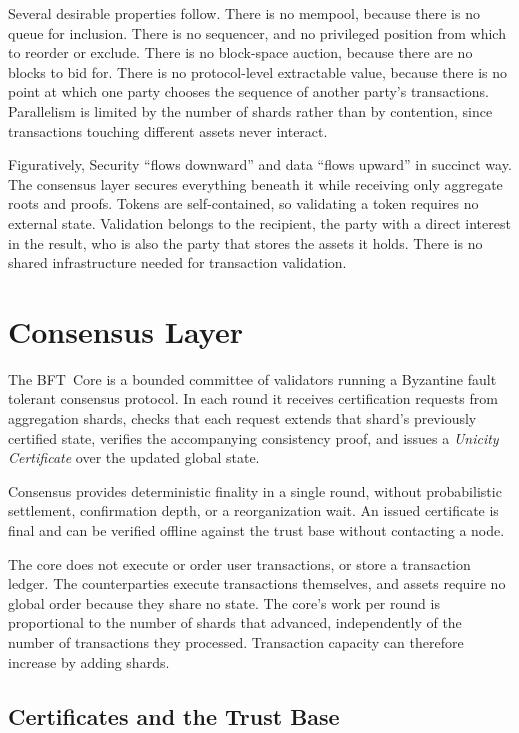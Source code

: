 Several desirable properties follow. There is no mempool, because there is no queue for inclusion. There is no sequencer, and no privileged position from which to reorder or exclude. There is no block-space auction, because there are no blocks to bid for. There is no protocol-level extractable value, because there is no point at which one party chooses the sequence of another party's transactions. Parallelism is limited by the number of shards rather than by contention, since transactions touching different assets never interact.

Figuratively, Security ``flows downward'' and data ``flows upward'' in succinct way. The consensus layer secures everything beneath it while receiving only aggregate roots and proofs. Tokens are self-contained, so validating a token requires no external state. Validation belongs to the recipient, the party with a direct interest in the result, who is also the party that stores the assets it holds. There is no shared infrastructure needed for transaction validation.

\section{Consensus Layer}

The BFT~Core is a bounded committee of validators running a Byzantine fault tolerant consensus protocol. In each round it receives certification requests from aggregation shards, checks that each request extends that shard's previously certified state, verifies the accompanying consistency proof, and issues a \emph{Unicity Certificate} over the updated global state.

Consensus provides deterministic finality in a single round, without probabilistic settlement, confirmation depth, or a reorganization wait. An issued certificate is final and can be verified offline against the trust base without contacting a node.

The core does not execute or order user transactions, or store a transaction ledger. The counterparties execute transactions themselves, and assets require no global order because they share no state. The core's work per round is proportional to the number of shards that advanced, independently of the number of transactions they processed. Transaction capacity can therefore increase by adding shards.

\subsection{Certificates and the Trust Base}

